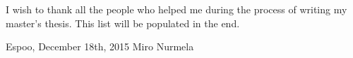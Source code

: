 \documentclass[12pt,a4paper,twoside]{report}
\newcommand{\DATE}{December 18th, 2015}
\newcommand{\AUTHOR}{Miro Nurmela}
\begin{document}
I wish to thank all the people who helped me during the process of writing
my master's thesis. This list will be populated in the end.

\vskip 10mm

\noindent Espoo, \DATE
\vskip 5mm
\noindent\AUTHOR

\cleardoublepage


\cleardoublepage

\tableofcontents
\label{pages-prelude}
\cleardoublepage




\startfirstchapter

\pagestyle{headings}

\startchapright
\end{document}
